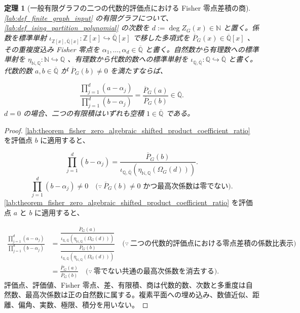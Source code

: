 \documentclass[11pt,a4paper]{article}
\newtheorem{theorem}[definition]{定理}
\theoremstyle{remark}
\begin{document}
\begin{theorem}[一般有限グラフの二つの代数的評価点における Fisher 零点差積の商]\label{lab:theorem_fisher_zero_algebraic_shifted_product_evaluation_quotient}
\cref{lab:def_finite_graph_input}
 の有限グラフについて、
\cref{lab:def_ising_partition_polynomial}
 の次数を
$d:=\deg Z_G(x)\in\mathbb N$
 と置く。係数を標準単射
$\iota_{\mathbb Z[x],\overline{\mathbb Q}[x]}:\mathbb Z[x]\hookrightarrow\overline{\mathbb Q}[x]$
 で移した多項式を
$\overline P_G(x)\in\overline{\mathbb Q}[x]$
、その重複度込み Fisher 零点を
$\alpha_1,\ldots,\alpha_d\in\overline{\mathbb Q}$
 と書く。自然数から有理数への標準単射を
$\eta_{\mathbb N,\mathbb Q}:\mathbb N\hookrightarrow\mathbb Q$
、有理数から代数的数への標準単射を
$\iota_{\mathbb Q,\overline{\mathbb Q}}:\mathbb Q\hookrightarrow\overline{\mathbb Q}$
 と書く。代数的数
$a,b\in\overline{\mathbb Q}$
 が
$\overline P_G(b)\ne0$
 を満たすならば、

\[\frac{
  \prod_{j=1}^{d}(a-\alpha_j)
}{
  \prod_{j=1}^{d}(b-\alpha_j)
}
=
\frac{
  \overline P_G(a)
}{
  \overline P_G(b)
}
\in\overline{\mathbb Q}.\]
$d=0$
 の場合、二つの有限積はいずれも空積
$1\in\overline{\mathbb Q}$
 である。

\end{theorem}
\begin{proof}
\cref{lab:theorem_fisher_zero_algebraic_shifted_product_coefficient_ratio}
 を評価点
$b$
 に適用すると、

\[\prod_{j=1}^{d}(b-\alpha_j)
=
\frac{
  \overline P_G(b)
}{
  \iota_{\mathbb Q,\overline{\mathbb Q}}\!\left(
    \eta_{\mathbb N,\mathbb Q}(\Omega_G(d))
  \right)
}.\]
\[\prod_{j=1}^{d}(b-\alpha_j)
\ne0
\quad\bigl(\because\ \overline P_G(b)\ne0\text{ かつ最高次係数は零でない}\bigr).\]
\cref{lab:theorem_fisher_zero_algebraic_shifted_product_coefficient_ratio}
 を評価点
$a$
 と
$b$
 に適用すると、

\[\begin{aligned}
\frac{
  \prod_{j=1}^{d}(a-\alpha_j)
}{
  \prod_{j=1}^{d}(b-\alpha_j)
}
&=
\frac{
  \dfrac{
    \overline P_G(a)
  }{
    \iota_{\mathbb Q,\overline{\mathbb Q}}\!\left(
      \eta_{\mathbb N,\mathbb Q}(\Omega_G(d))
    \right)
  }
}{
  \dfrac{
    \overline P_G(b)
  }{
    \iota_{\mathbb Q,\overline{\mathbb Q}}\!\left(
      \eta_{\mathbb N,\mathbb Q}(\Omega_G(d))
    \right)
  }
}
\quad\bigl(\because\ \text{二つの代数的評価点における零点差積の係数比表示}\bigr)\\
&=
\frac{
  \overline P_G(a)
}{
  \overline P_G(b)
}
\quad\bigl(\because\ \text{零でない共通の最高次係数を消去する}\bigr).
\end{aligned}\]
評価点、評価値、Fisher 零点、差、有限積、商は代数的数、次数と多重度は自然数、最高次係数は正の自然数に属する。複素平面への埋め込み、数値近似、距離、偏角、実数、極限、積分を用いない。

\end{proof}
\end{document}
